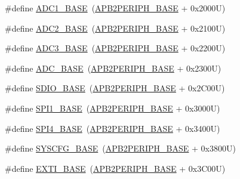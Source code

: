 \begin{DoxyCompactItemize}
\item 
\#define \hyperlink{group___peripheral__memory__map_ga695c9a2f892363a1c942405c8d351b91}{A\+D\+C1\+\_\+\+B\+A\+SE}~(\hyperlink{group___peripheral__memory__map_ga25b99d6065f1c8f751e78f43ade652cb}{A\+P\+B2\+P\+E\+R\+I\+P\+H\+\_\+\+B\+A\+SE} + 0x2000\+U)
\item 
\#define \hyperlink{group___peripheral__memory__map_ga6544abc57f9759f610eee09a02442ae6}{A\+D\+C2\+\_\+\+B\+A\+SE}~(\hyperlink{group___peripheral__memory__map_ga25b99d6065f1c8f751e78f43ade652cb}{A\+P\+B2\+P\+E\+R\+I\+P\+H\+\_\+\+B\+A\+SE} + 0x2100\+U)
\item 
\#define \hyperlink{group___peripheral__memory__map_gaca766f86c8e0b00a8e2b0224dcbb4c82}{A\+D\+C3\+\_\+\+B\+A\+SE}~(\hyperlink{group___peripheral__memory__map_ga25b99d6065f1c8f751e78f43ade652cb}{A\+P\+B2\+P\+E\+R\+I\+P\+H\+\_\+\+B\+A\+SE} + 0x2200\+U)
\item 
\#define \hyperlink{group___peripheral__memory__map_gad06cb9e5985bd216a376f26f22303cd6}{A\+D\+C\+\_\+\+B\+A\+SE}~(\hyperlink{group___peripheral__memory__map_ga25b99d6065f1c8f751e78f43ade652cb}{A\+P\+B2\+P\+E\+R\+I\+P\+H\+\_\+\+B\+A\+SE} + 0x2300\+U)
\item 
\#define \hyperlink{group___peripheral__memory__map_ga95dd0abbc6767893b4b02935fa846f52}{S\+D\+I\+O\+\_\+\+B\+A\+SE}~(\hyperlink{group___peripheral__memory__map_ga25b99d6065f1c8f751e78f43ade652cb}{A\+P\+B2\+P\+E\+R\+I\+P\+H\+\_\+\+B\+A\+SE} + 0x2\+C00\+U)
\item 
\#define \hyperlink{group___peripheral__memory__map_ga50cd8b47929f18b05efbd0f41253bf8d}{S\+P\+I1\+\_\+\+B\+A\+SE}~(\hyperlink{group___peripheral__memory__map_ga25b99d6065f1c8f751e78f43ade652cb}{A\+P\+B2\+P\+E\+R\+I\+P\+H\+\_\+\+B\+A\+SE} + 0x3000\+U)
\item 
\#define \hyperlink{group___peripheral__memory__map_gac5cfaedf263cee1e79554665f921c708}{S\+P\+I4\+\_\+\+B\+A\+SE}~(\hyperlink{group___peripheral__memory__map_ga25b99d6065f1c8f751e78f43ade652cb}{A\+P\+B2\+P\+E\+R\+I\+P\+H\+\_\+\+B\+A\+SE} + 0x3400\+U)
\item 
\#define \hyperlink{group___peripheral__memory__map_ga62246020bf3b34b6a4d8d0e84ec79d3d}{S\+Y\+S\+C\+F\+G\+\_\+\+B\+A\+SE}~(\hyperlink{group___peripheral__memory__map_ga25b99d6065f1c8f751e78f43ade652cb}{A\+P\+B2\+P\+E\+R\+I\+P\+H\+\_\+\+B\+A\+SE} + 0x3800\+U)
\item 
\#define \hyperlink{group___peripheral__memory__map_ga87371508b3bcdcd98cd1ec629be29061}{E\+X\+T\+I\+\_\+\+B\+A\+SE}~(\hyperlink{group___peripheral__memory__map_ga25b99d6065f1c8f751e78f43ade652cb}{A\+P\+B2\+P\+E\+R\+I\+P\+H\+\_\+\+B\+A\+SE} + 0x3\+C00\+U)

\end{DoxyCompactItemize}
